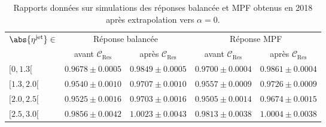 \begin{table}[h]
\centering
\begin{tabular}{lcccc}
\toprule
\multirow{2}{*}{$\abs{\eta^\text{jet}}\in$} & \multicolumn{2}{c}{Réponse balancée} & \multicolumn{2}{c}{Réponse MPF} \\
\cmidrule(lr){2-3}\cmidrule(lr){4-5}
 & avant $\mathcal{C}_\text{Res}$ & après $\mathcal{C}_\text{Res}$ & avant $\mathcal{C}_\text{Res}$ & après $\mathcal{C}_\text{Res}$ \\
\midrule
$[\num{0}, \num{1.3}[$ & $\num{0.9678}\pm\num{0.0005}$ & $\num{0.9849}\pm\num{0.0005}$ & $\num{0.9700}\pm\num{0.0004}$ & $\num{0.9861}\pm\num{0.0004}$ \\
$[\num{1.3}, \num{2.0}[$ & $\num{0.9540}\pm\num{0.0010}$ & $\num{0.9707}\pm\num{0.0010}$ & $\num{0.9557}\pm\num{0.0009}$ & $\num{0.9726}\pm\num{0.0009}$ \\
$[\num{2.0}, \num{2.5}[$ & $\num{0.9525}\pm\num{0.0016}$ & $\num{0.9703}\pm\num{0.0016}$ & $\num{0.9505}\pm\num{0.0014}$ & $\num{0.9674}\pm\num{0.0015}$ \\
$[\num{2.5}, \num{3.0}[$ & $\num{0.9856}\pm\num{0.0042}$ & $\num{1.0023}\pm\num{0.0043}$ & $\num{0.9813}\pm\num{0.0038}$ & $\num{1.0004}\pm\num{0.0038}$ \\
\bottomrule
\end{tabular}
\caption{Rapports données sur simulations des réponses balancée et MPF obtenus en 2018 après extrapolation vers $\alpha=0$.}
\label{tab-responses_recap_table_L2L3Res_cross_check_2018ABCD}
\end{table}